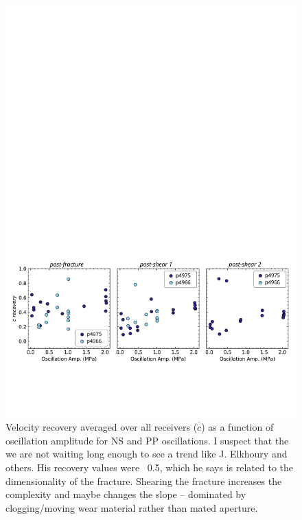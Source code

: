 \documentclass[letterpaper,10pt]{article}
\begin{document}
\begin{figure}[ht]
	\includegraphics[width=1\columnwidth]{Cdot_PP_amp}
	\caption{Velocity recovery averaged over all receivers ($ \overline {\dot c} $) as a function of oscillation amplitude for NS and PP oscillations. 
	I suspect that the we are not waiting long enough to see a trend like J. Elkhoury and others. His recovery values were ~0.5, which he says is related to the dimensionality of the fracture. Shearing the fracture increases the complexity and maybe changes the slope -- dominated by clogging/moving wear material rather than mated aperture.}
	\label{fig:cdot_amp}
\end{figure}

\newpage


\end{document}
